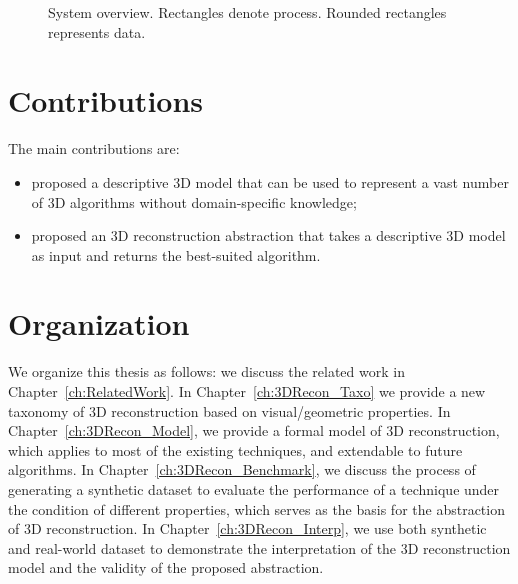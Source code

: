 \begin{figure}[h]
\caption{System overview. Rectangles denote process. Rounded rectangles represents data.}
\label{system_overview}
\end{figure}

\section{Contributions}
The main contributions are:
\begin{itemize}
\item proposed a descriptive 3D model that can be used to represent a vast number of 3D algorithms without domain-specific knowledge;
\item proposed an 3D reconstruction abstraction that takes a descriptive 3D model as input and returns the best-suited algorithm.
\end{itemize}

\section{Organization}
We organize this thesis as follows: we discuss the related work in Chapter~\ref{ch:RelatedWork}. In Chapter~\ref{ch:3DRecon_Taxo} we provide a new taxonomy of 3D reconstruction based on visual/geometric properties. In Chapter~\ref{ch:3DRecon_Model}, we provide  a formal  model of 3D reconstruction, which applies to most of the existing techniques, and extendable to future algorithms. In Chapter~\ref{ch:3DRecon_Benchmark}, we discuss the process of generating a synthetic dataset to evaluate the performance of a technique under the condition of different properties, which serves as the basis for the abstraction of 3D reconstruction. In Chapter~\ref{ch:3DRecon_Interp}, we  use both synthetic and real-world dataset to demonstrate the  interpretation of the 3D reconstruction model and the validity of the proposed abstraction.